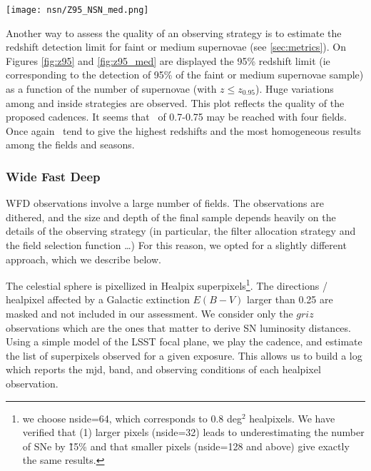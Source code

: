 \begin{sidewaysfigure}
\begin{center}  
  \texttt{[image: nsn/Z95\_NSN\_med.png]}
  \caption{Median 95\% redshift limit (ie corresponding to the detection of 95\% of the medium supernovae sample) as a function of the number of supernovae (with $z\leq z_{0.95}^{med}$).}\label{fig:z95_med}
\end{center}
\end{sidewaysfigure}



Another way to assess the quality of an observing strategy is to estimate the redshift detection limit for faint or medium supernovae (see \ref{sec:metrics}). On Figures \ref{fig:z95} and \ref{fig:z95_med} are  displayed the 95\% redshift limit (ie corresponding to the detection of 95\% of the faint or medium supernovae sample) as a function of the number of supernovae (with  $z\leq z_{0.95}$). Huge variations among and inside strategies are observed. This plot reflects the quality of the proposed cadences. It seems that \redshift~of 0.7-0.75 may be reached with four fields. Once again \feature~tend to give the highest redshifts and the most homogeneous results among the fields and seasons. 


\subsubsection{Wide Fast Deep}
\label{sec:wide_fast_deep_analysis_method}


WFD observations involve a large number of fields.  The observations
are dithered, and the size and depth of the final sample depends
heavily on the details of the observing strategy (in particular, the
filter allocation strategy and the field selection function \ldots)
For this reason, we opted for a slightly different approach, which we
describe below.

The celestial sphere is pixellized in Healpix superpixels\footnote{we
  choose nside=64, which corresponds to 0.8 deg$^2$ healpixels.  We
  have verified that (1) larger pixels (nside=32) leads to
  underestimating the number of SNe by \~ 15\% and
  that smaller pixels (nside=128 and above) give exactly the same
  results.}.  The directions / healpixel affected by a Galactic extinction $E(B-V)$ larger than 0.25
are masked and not included in our assessment. We consider only the $griz$ observations which are the ones
that matter to derive SN luminosity distances. 
Using a simple model of the LSST focal plane, we play
the cadence, and estimate the list of superpixels observed for a
given exposure. This allows us to build a log which reports the mjd,
band, and observing conditions of each healpixel observation.

